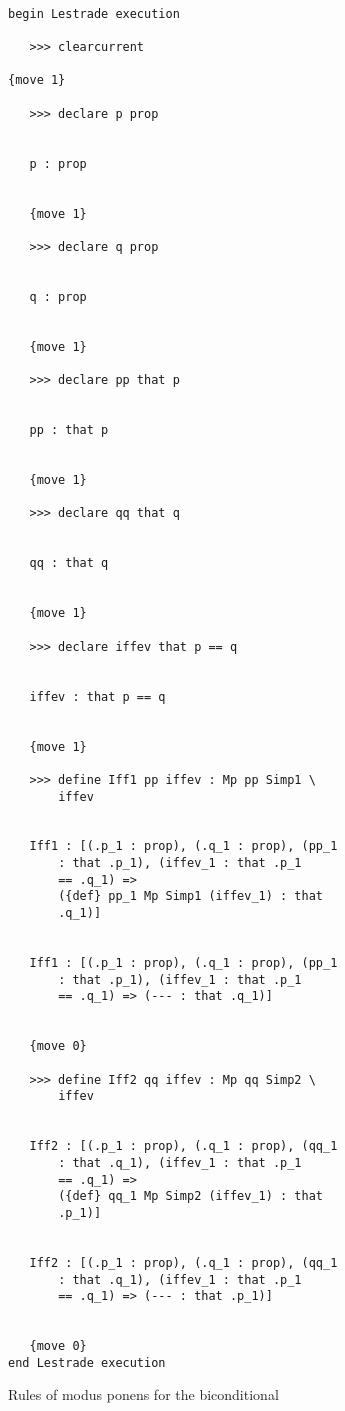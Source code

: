 \documentclass[12pt]{article}
\begin{document}
\begin{verbatim}

begin Lestrade execution

   >>> clearcurrent

{move 1}

   >>> declare p prop


   p : prop


   {move 1}

   >>> declare q prop


   q : prop


   {move 1}

   >>> declare pp that p


   pp : that p


   {move 1}

   >>> declare qq that q


   qq : that q


   {move 1}

   >>> declare iffev that p == q


   iffev : that p == q


   {move 1}

   >>> define Iff1 pp iffev : Mp pp Simp1 \
       iffev


   Iff1 : [(.p_1 : prop), (.q_1 : prop), (pp_1 
       : that .p_1), (iffev_1 : that .p_1 
       == .q_1) => 
       ({def} pp_1 Mp Simp1 (iffev_1) : that 
       .q_1)]


   Iff1 : [(.p_1 : prop), (.q_1 : prop), (pp_1 
       : that .p_1), (iffev_1 : that .p_1 
       == .q_1) => (--- : that .q_1)]


   {move 0}

   >>> define Iff2 qq iffev : Mp qq Simp2 \
       iffev


   Iff2 : [(.p_1 : prop), (.q_1 : prop), (qq_1 
       : that .q_1), (iffev_1 : that .p_1 
       == .q_1) => 
       ({def} qq_1 Mp Simp2 (iffev_1) : that 
       .p_1)]


   Iff2 : [(.p_1 : prop), (.q_1 : prop), (qq_1 
       : that .q_1), (iffev_1 : that .p_1 
       == .q_1) => (--- : that .p_1)]


   {move 0}
end Lestrade execution
\end{verbatim}

Rules of modus ponens for the biconditional
\end{document}

